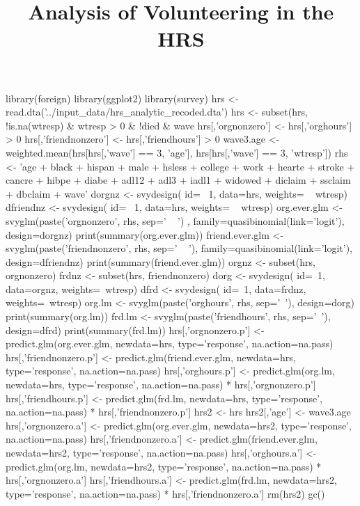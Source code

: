 \documentclass{article}
\title{Analysis of Volunteering in the HRS}
\begin{document}
\maketitle
\listoftables
\listoffigures

\begin{Rcode}
library(foreign)
library(ggplot2)
library(survey)
hrs <- read.dta('../input_data/hrs_analytic_recoded.dta')
hrs <- subset(hrs, !is.na(wtresp) & wtresp > 0 & !died & wave %
hrs[,'orgnonzero'] <- hrs[,'orghours'] > 0
hrs[,'friendnonzero'] <- hrs[,'friendhours'] > 0
wave3.age <- weighted.mean(hrs[hrs[,'wave'] == 3, 'age'], hrs[hrs[,'wave'] == 3, 'wtresp'])
rhs <- 'age + black + hispan + male + hsless + college + work + hearte + stroke + cancre + hibpe + diabe + adl12 + adl3 + iadl1 + widowed + diclaim + ssclaim + dbclaim + wave'
dorgnz <- svydesign( id=~ 1, data=hrs, weights= ~ wtresp)
dfriendnz <- svydesign( id=~ 1, data=hrs, weights= ~ wtresp)
org.ever.glm <- svyglm(paste('orgnonzero', rhs, sep=' ~ ') , family=quasibinomial(link='logit'), design=dorgnz)
print(summary(org.ever.glm))
friend.ever.glm <- svyglm(paste('friendnonzero', rhs, sep=' ~ '), family=quasibinomial(link='logit'), design=dfriendnz)
print(summary(friend.ever.glm))
orgnz <- subset(hrs, orgnonzero)
frdnz <- subset(hrs, friendnonzero)
dorg <- svydesign( id=~1, data=orgnz, weights=~wtresp)
dfrd <- svydesign( id=~1, data=frdnz, weights=~wtresp)
org.lm <- svyglm(paste('orghours', rhs, sep='~'), design=dorg)
print(summary(org.lm))
frd.lm <- svyglm(paste('friendhours', rhs, sep='~'), design=dfrd)
print(summary(frd.lm))
hrs[,'orgnonzero.p'] <- predict.glm(org.ever.glm, newdata=hrs, type='response', na.action=na.pass)
hrs[,'friendnonzero.p'] <- predict.glm(friend.ever.glm, newdata=hrs, type='response', na.action=na.pass)
hrs[,'orghours.p'] <- predict.glm(org.lm, newdata=hrs, type='response', na.action=na.pass) * hrs[,'orgnonzero.p']
hrs[,'friendhours.p'] <- predict.glm(frd.lm, newdata=hrs, type='response', na.action=na.pass) * hrs[,'friendnonzero.p']
hrs2 <- hrs
hrs2[,'age'] <- wave3.age
hrs[,'orgnonzero.a'] <- predict.glm(org.ever.glm, newdata=hrs2, type='response', na.action=na.pass)
hrs[,'friendnonzero.a'] <- predict.glm(friend.ever.glm, newdata=hrs2, type='response', na.action=na.pass)
hrs[,'orghours.a'] <- predict.glm(org.lm, newdata=hrs2, type='response', na.action=na.pass) * hrs[,'orgnonzero.a']
hrs[,'friendhours.a'] <- predict.glm(frd.lm, newdata=hrs2, type='response', na.action=na.pass) * hrs[,'friendnonzero.a']
rm(hrs2)
gc()
\end{Rcode}
\end{document}
